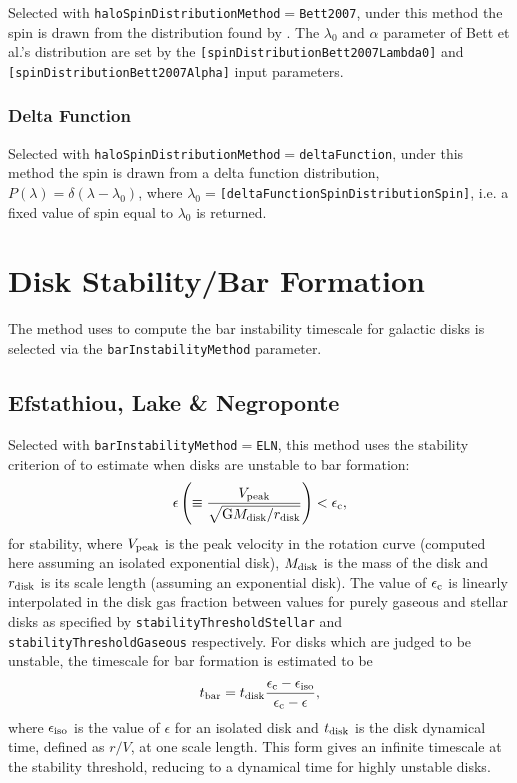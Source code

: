Selected with {\tt haloSpinDistributionMethod}$=${\tt Bett2007}, under this method the spin is drawn from the distribution found by \cite{bett_spin_2007}. The $\lambda_0$ and $\alpha$ parameter of Bett et al.'s distribution are set by the {\tt [spinDistributionBett2007Lambda0]} and {\tt [spinDistributionBett2007Alpha]} input parameters.

\subsubsection{Delta Function}

Selected with {\tt haloSpinDistributionMethod}$=${\tt deltaFunction}, under this method the spin is drawn from a delta function distribution, $P(\lambda) = \delta(\lambda-\lambda_0)$, where $\lambda_0=${\tt [deltaFunctionSpinDistributionSpin]}, i.e. a fixed value of spin equal to $\lambda_0$ is returned.

\section{Disk Stability/Bar Formation}\label{sec:DiskStability}

The method uses to compute the bar instability timescale for galactic disks is selected via the {\tt barInstabilityMethod} parameter.

\subsection{Efstathiou, Lake \& Negroponte}

Selected with {\tt barInstabilityMethod}$=${\tt ELN}, this method uses the stability criterion of \cite{efstathiou_stability_1982} to estimate when disks are unstable to bar formation:
\begin{equation}
 \epsilon \left( \equiv {V_{\rm peak} \over \sqrt{\G M_{\rm disk}/r_{\rm disk}}} \right) < \epsilon_{\rm c},
\end{equation}
for stability, where $V_{\rm peak}$ is the peak velocity in the rotation curve (computed here assuming an isolated exponential disk), $M_{\rm disk}$ is the mass of the disk and $r_{\rm disk}$ is its scale length (assuming an exponential disk). The value of $\epsilon_{\rm c}$ is linearly interpolated in the disk gas fraction between values for purely gaseous and stellar disks as specified by {\tt stabilityThresholdStellar} and {\tt stabilityThresholdGaseous} respectively. For disks which are judged to be unstable, the timescale for bar formation is estimated to be
\begin{equation}
 t_{\rm bar} = t_{\rm disk} {\epsilon_{\rm c} - \epsilon_{\rm iso} \over \epsilon_{\rm c} - \epsilon},
\end{equation}
where $\epsilon_{\rm iso}$ is the value of $\epsilon$ for an isolated disk and $t_{\rm disk}$ is the disk dynamical time, defined as $r/V$, at one scale length. This form gives an infinite timescale at the stability threshold, reducing to a dynamical time for highly unstable disks.

